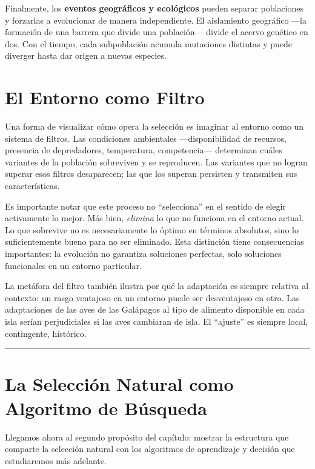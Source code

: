 \documentclass[
  letterpaper,
  DIV=11,
  numbers=noendperiod]{scrreprt}
\begin{document}
Finalmente, los \textbf{eventos geográficos y ecológicos} pueden separar
poblaciones y forzarlas a evolucionar de manera independiente. El
aislamiento geográfico ---la formación de una barrera que divide una
población--- divide el acervo genético en dos. Con el tiempo, cada
subpoblación acumula mutaciones distintas y puede diverger hasta dar
origen a nuevas especies.

\section{El Entorno como Filtro}\label{el-entorno-como-filtro}

Una forma de visualizar cómo opera la selección es imaginar al entorno
como un sistema de filtros. Las condiciones ambientales
---disponibilidad de recursos, presencia de depredadores, temperatura,
competencia--- determinan cuáles variantes de la población sobreviven y
se reproducen. Las variantes que no logran superar esos filtros
desaparecen; las que los superan persisten y transmiten sus
características.

Es importante notar que este proceso no ``selecciona'' en el sentido de
elegir activamente lo mejor. Más bien, \emph{elimina} lo que no funciona
en el entorno actual. Lo que sobrevive no es necesariamente lo óptimo en
términos absolutos, sino lo suficientemente bueno para no ser eliminado.
Esta distinción tiene consecuencias importantes: la evolución no
garantiza soluciones perfectas, solo soluciones funcionales en un
entorno particular.

La metáfora del filtro también ilustra por qué la adaptación es siempre
relativa al contexto: un rasgo ventajoso en un entorno puede ser
desventajoso en otro. Las adaptaciones de las aves de las Galápagos al
tipo de alimento disponible en cada isla serían perjudiciales si las
aves cambiaran de isla. El ``ajuste'' es siempre local, contingente,
histórico.

\begin{center}\rule{0.5\linewidth}{0.5pt}\end{center}

\section{La Selección Natural como Algoritmo de
Búsqueda}\label{la-selecciuxf3n-natural-como-algoritmo-de-buxfasqueda}

Llegamos ahora al segundo propósito del capítulo: mostrar la estructura
que comparte la selección natural con los algoritmos de aprendizaje y
decisión que estudiaremos más adelante.
\end{document}
